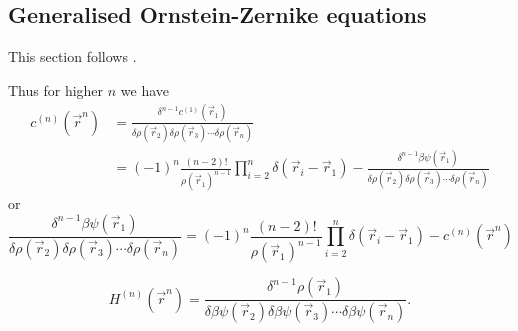 \subsection{Generalised Ornstein-Zernike equations}

This section follows \cite{Barrat1988}.

Thus for higher $n$ we have
\begin{equation}
  \begin{aligned}
    c^{(n)}(\vec{r}^n) &=
    \frac{\delta^{n-1} c^{(1)}(\vec{r}_1)}{\delta \rho(\vec{r}_2) \delta \rho(\vec{r}_3) \cdots \delta \rho(\vec{r}_n)} \\
    &=
    (-1)^n
    \frac{(n-2)!}{\rho(\vec{r}_1)^{n-1}}
    \prod_{i=2}^n \delta(\vec{r}_i - \vec{r}_1) -
    \frac{\delta^{n-1} \beta\psi(\vec{r}_1)}{\delta \rho(\vec{r}_2) \delta \rho(\vec{r}_3) \cdots \delta \rho(\vec{r}_n)}
  \end{aligned}
\end{equation}
or
\begin{equation}
  \frac{\delta^{n-1} \beta\psi(\vec{r}_1)}{\delta \rho(\vec{r}_2) \delta \rho(\vec{r}_3) \cdots \delta \rho(\vec{r}_n)} =
  (-1)^n
  \frac{(n-2)!}{\rho(\vec{r}_1)^{n-1}}
  \prod_{i=2}^n \delta(\vec{r}_i - \vec{r}_1) -
  c^{(n)}(\vec{r}^n)
\end{equation}

\begin{equation*}
  H^{(n)}(\vec{r}^n) =
  \frac{\delta^{n-1} \rho(\vec{r}_1)}{\delta \beta\psi(\vec{r}_2) \delta \beta\psi(\vec{r}_3) \cdots \delta \beta\psi(\vec{r}_n)}.
\end{equation*}

